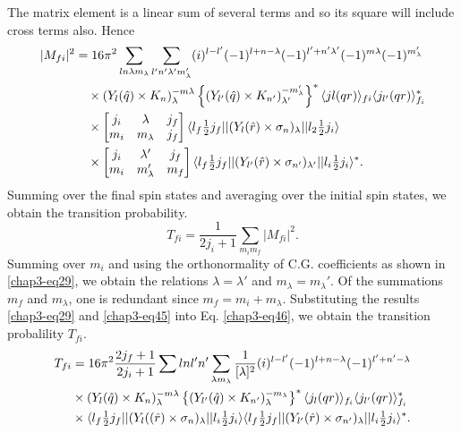 The matrix element is a linear sum of several terms and so its square will include cross terms also. Hence
\begin{align}
  |M_{fi}|^2 & = 16\pi^2 \sum_{ln\lambda m_\lambda} \sum_{l' n' \lambda' m_\lambda '} (i)^{l-l'} (-1)^{l + n - \lambda} (-1)^{l' + n' \lambda'} (-1)^{m\lambda} (-1)^{m_\lambda'} \notag \\
  &  \quad \times (Y_l ({\boldmath \hat{q}}) \times {\boldmath K}_n)_\lambda^{-m\lambda}  \left\{ (Y_{l'} ({\boldmath \hat{q}}) \times {\boldmath K}_{n'})_{\lambda'}^{-m_\lambda'}\right\}^\ast \langle jl (qr)\rangle_{fi} \langle j_{l'}(qr)\rangle^\ast_{f_i} \notag \\
  & \quad \times \begin{bmatrix} j_i & \lambda & j_f\\ m_i & m_\lambda & j_f \end{bmatrix}
  \langle l_f \tfrac{1}{2} j_f || (Y_l ({\boldmath \hat{r}}) \times \sigma_n)_\lambda || l_2 \tfrac{1}{2} j_i \rangle \notag \\
  & \quad \times \begin{bmatrix} j_i & \lambda' & j_f\\ m_i & m_\lambda' & m_f \end{bmatrix}
  \langle l_f \tfrac{1}{2} j_f || (Y_{l'} ({\boldmath \hat{r}}) \times \sigma_{n'})_{\lambda'} || l_i \tfrac{1}{2} j_i \rangle^\ast. \label{chap3-eq45}
\end{align}
Summing over the final spin states and averaging over the initial spin states, we obtain the transition probability.
\begin{equation}
  T_{fi} = \frac{1}{2j_i +1} \sum_{m_i m_f} |M_{fi}|^2. \label{chap3-eq46}
\end{equation}
Summing over $m_i$ and using the orthonormality of C.G. coefficients as shown in \eqref{chap3-eq29}, we obtain the relations $\lambda = \lambda'$ and $m_\lambda= m_\lambda'$. Of the summations $m_f$ and $m_\lambda$, one is redundant since $m_f= m_i+ m_\lambda$. Substituting the results \eqref{chap3-eq29} and \eqref{chap3-eq45} into Eq. \eqref{chap3-eq46}, we obtain the transition probalility $T_{fi}$.
\begin{align}
  T_{fi} & = 16\pi^2 \frac{2j_f +1}{2j_i+1} \sum{lnl'n'} \sum_{\lambda m_\lambda} \frac{1}{[\lambda]^2} (i)^{l-l'} (-1)^{l+ n - \lambda} (-1)^{l' + n'-\lambda}\notag \\
  &  \times (Y_l ({\boldmath \hat{q}}) \times {\boldmath K}_n)^{-m\lambda}_\lambda \left\{ (Y_{l'}({\boldmath \hat{q}}) \times {\boldmath K}_{n'})_\lambda^{-m_\lambda}\right\}^\ast \langle j_l (qr)\rangle_{f_i} \langle j_{l'}(qr)\rangle_{f_i}^\ast \notag \\
  &  \times \langle l_f \tfrac{1}{2} j_f || (Y_l (({\boldmath \hat{r}}) \times \sigma_n)_\lambda || l_i \tfrac{1}{2}j_i \rangle \langle l_f \tfrac{1}{2} j_f  || (Y_{l'} ({\boldmath \hat{r}}) \times \sigma_{n'})_\lambda || l_i \tfrac{1}{2} j_i \rangle^\ast. \label{chap3-eq47}
\end{align}

